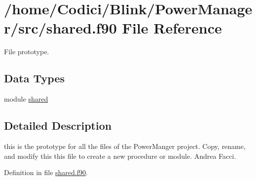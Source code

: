 \hypertarget{shared_8f90}{\section{/home/\-Codici/\-Blink/\-Power\-Manager/src/shared.f90 File Reference}
\label{shared_8f90}
}


File prototype.  


\subsection*{Data Types}
\begin{DoxyCompactItemize}
\item 
module \hyperlink{classshared}{shared}
\end{DoxyCompactItemize}


\subsection{Detailed Description}
this is the prototype for all the files of the Power\-Manger project. Copy, rename, and modify this this file to create a new procedure or module.  Andrea Facci. 

Definition in file \hyperlink{shared_8f90_source}{shared.\-f90}.

